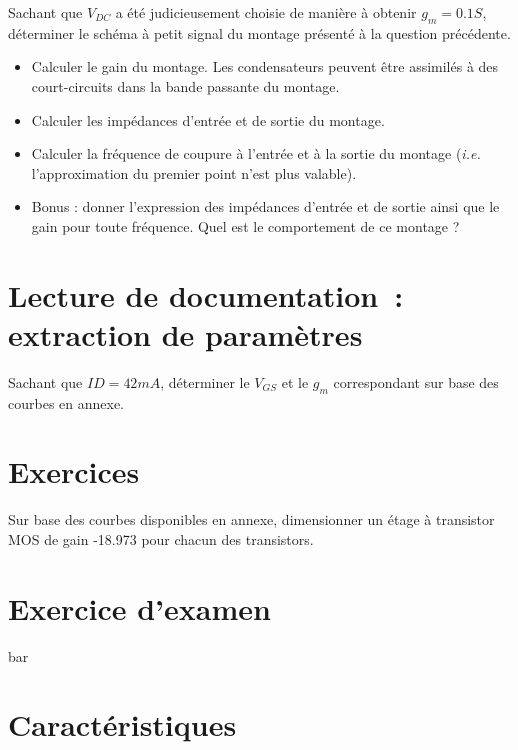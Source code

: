 \documentclass{../template/tp}
\begin{document}
\Question
{
Sachant que $V_{DC}$ a été judicieusement choisie de manière à obtenir $g_m=0.1S$, déterminer le schéma à petit signal du montage présenté à la question précédente.
 
 \begin{itemize}
 \item Calculer le gain du montage. Les condensateurs peuvent être assimilés à des court-circuits dans la bande passante du montage.
 \item Calculer les impédances d'entrée et de sortie du montage.
 \item Calculer la fréquence de coupure à l'entrée et à la sortie du montage (\textit{i.e.} l'approximation du premier point n'est plus valable).
 \item Bonus : donner l'expression des impédances d'entrée et de sortie ainsi que le gain pour toute fréquence. Quel est le comportement de ce montage ?
 \end{itemize}

}
{%
}



\section{Lecture de documentation~: extraction de paramètres}

Sachant que $ID=42mA$, déterminer le $V_{GS}$ et le $g_m$ correspondant sur base des courbes en annexe.

\section{Exercices}
Sur base des courbes disponibles en annexe, dimensionner un étage à transistor MOS de gain -18.973 pour chacun des transistors. 

\section{Exercice d'examen}

%
{
	bar
}
\appendix
\section{Caractéristiques}
\end{document}

